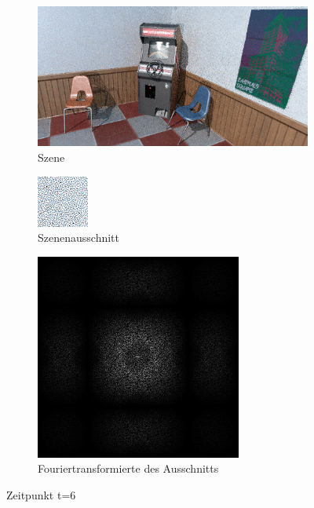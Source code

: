 \begin{figure}[H]
    \begin{subfigure}{\textwidth}   
        \centering \includegraphics[scale=.25]{content/TemporalerAlg/Bilder/Retargeting/Screenshots/seed_debug_8.0_selection.png}
        \caption{Szene}
        \label{fig:Retargeting_And_Sorting_Szene_t6}
    \end{subfigure}
    \begin{subfigure}{0.5\textwidth}
        \centering\includegraphics[width=0.4\linewidth]{content/TemporalerAlg/Bilder/Retargeting/Screenshots/seed_debug_8.0_ausschnitt.png} 
        \caption{Szenenausschnitt}
        \label{fig:Retargeting_And_Sorting_ausschnitt_t6}
    \end{subfigure}
    \begin{subfigure}{0.5\textwidth}
        \centering\includegraphics[width=0.4\linewidth]{content/TemporalerAlg/Bilder/Retargeting/Screenshots/Spektren/seed_debug_8.0_ausschnitt.png}
        \caption{Fouriertransformierte des Ausschnitts}
        \label{fig:Retargeting_And_Sorting_Fouriertransformierte_t6}
    \end{subfigure}
        \caption{Zeitpunkt t=6}
        \label{fig:Retargeting_And_Sorting_Verlauf_t6}
\end{figure}

